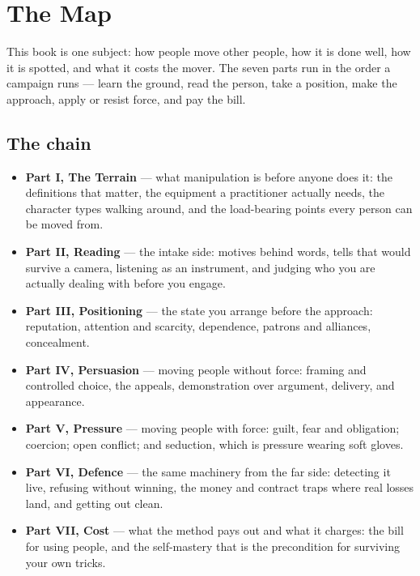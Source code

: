 
\chapter*{The Map}

This book is one subject: how people move other people, how it is done
well, how it is spotted, and what it costs the mover. The seven parts run
in the order a campaign runs --- learn the ground, read the person, take a
position, make the approach, apply or resist force, and pay the bill.

\section*{The chain}

\begin{itemize}
\item \textbf{Part I, The Terrain} --- what manipulation is before anyone
  does it: the definitions that matter, the equipment a practitioner
  actually needs, the character types walking around, and the load-bearing
  points every person can be moved from.
\item \textbf{Part II, Reading} --- the intake side: motives behind words,
  tells that would survive a camera, listening as an instrument, and
  judging who you are actually dealing with before you engage.
\item \textbf{Part III, Positioning} --- the state you arrange before the
  approach: reputation, attention and scarcity, dependence, patrons and
  alliances, concealment.
\item \textbf{Part IV, Persuasion} --- moving people without force:
  framing and controlled choice, the appeals, demonstration over argument,
  delivery, and appearance.
\item \textbf{Part V, Pressure} --- moving people with force: guilt,
  fear and obligation; coercion; open conflict; and seduction, which is
  pressure wearing soft gloves.
\item \textbf{Part VI, Defence} --- the same machinery from the far side:
  detecting it live, refusing without winning, the money and contract
  traps where real losses land, and getting out clean.
\item \textbf{Part VII, Cost} --- what the method pays out and what it
  charges: the bill for using people, and the self-mastery that is the
  precondition for surviving your own tricks.
\end{itemize}

